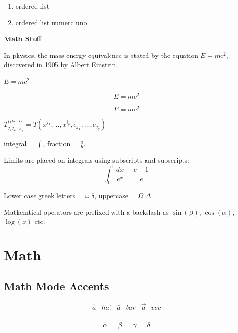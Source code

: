 \documentclass[12pt, a4paper]{article} %
\begin{document}
\begin{enumerate}
	\item ordered list
	\item ordered list numero uno
\end{enumerate}

\textbf{Math Stuff}

In physics, the mass-energy equivalence is stated by the equation $E=mc^2$, discovered in 1905 by Albert Einstein.

\begin{math}
	E=mc^2
\end{math}

\[E=mc^2\]

\begin{equation}
	E=mc^2
\end{equation}

\begin{math}
	T^{i_1 i_2 \dots i_p}_{j_1 j_2 \dots j_q} = T(x^{i_1}, \dots, x^{i_p}, e_{j_1}, \dots, e_{j_q})
\end{math}

\vspace{5mm}

integral = $\int$, fraction = $\frac{a}{b}$.

Limits are placed on integrals using subscripts and subscripts:
\[ \int_0^1 \frac{dx}{e^x} = \frac{e-1}{e}\]

Lower case greek letters = $\omega$ $\delta$, uppercase = $\Omega$ $\Delta$

Mathemtical operators are prefixed with a backslash as $\sin(\beta)$, $\cos(\alpha)$, $\log(x)$ etc.

\section{Math}

\subsection{Math Mode Accents}

\begin{align*}
    \hat{a}&hat & \bar{a}&bar & \vec{a}&vec \\
\end{align*}

\begin{align*}
    \alpha && \beta && \gamma && \delta \\

\end{align*}
\end{document}
